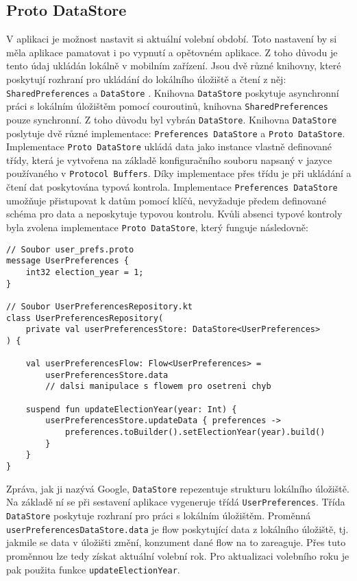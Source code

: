 \subsection*  {Proto DataStore}
V aplikaci je možnost nastavit si aktuální volební období. Toto nastavení by si měla aplikace pamatovat i po vypnutí a opětovném aplikace. Z toho důvodu je tento údaj ukládán lokálně v mobilním zařízení. Jsou dvě různé knihovny, které poskytují rozhraní pro ukládání do lokálního úložiště a čtení z něj: \lstinline|SharedPreferences| \cite{shared-preferences} a \lstinline|DataStore| \cite{data-store}. Knihovna \lstinline|DataStore| poskytuje asynchronní práci s lokálním úložištěm pomocí couroutinů, knihovna \lstinline|SharedPreferences| pouze synchronní. Z toho důvodu byl vybrán \lstinline|DataStore|. Knihovna \lstinline|DataStore| poslytuje dvě různé implementace: \lstinline|Preferences DataStore| a \lstinline|Proto DataStore|. Implementace \lstinline|Proto DataStore| ukládá data jako instance vlastně definované třídy, která je vytvořena na základě konfiguračního souboru napsaný v jazyce používaného v \lstinline|Protocol Buffers|. Díky implementace přes třídu je při ukládání a čtení dat poskytována typová kontrola. Implementace \lstinline|Preferences DataStore| umožňuje přistupovat k datům pomocí klíčů, nevyžaduje předem definované schéma pro data a neposkytuje typovou kontrolu. Kvůli absenci typové kontroly byla zvolena implementace \lstinline|Proto DataStore|, který funguje následovně:

\begin{lstlisting}[caption={Ukázka práce s Proto DataStore}, label={lst:proto-datastore}, tabsize=2]
// Soubor user_prefs.proto
message UserPreferences {
	int32 election_year = 1;
}

// Soubor UserPreferencesRepository.kt
class UserPreferencesRepository(
	private val userPreferencesStore: DataStore<UserPreferences>
) {
	
	val userPreferencesFlow: Flow<UserPreferences> = 
		userPreferencesStore.data
		// dalsi manipulace s flowem pro osetreni chyb
	
	suspend fun updateElectionYear(year: Int) {
		userPreferencesStore.updateData { preferences ->
			preferences.toBuilder().setElectionYear(year).build()
		}
	}
}
\end{lstlisting}

\noindent Zpráva, jak ji nazývá Google, \lstinline|DataStore| repezentuje strukturu lokálního úložiště. Na základě ní se při sestavení aplikace vygeneruje třídá \lstinline|UserPreferences|. Třída \lstinline|DataStore| poskytuje rozhraní pro práci s lokálním úložištěm. Proměnná \lstinline|userPreferencesDataStore.data| je flow poskytující data z lokálního úložiště, tj. jakmile se data v úložišti změní, konzument dané flow na to zareaguje. Přes tuto proměnnou lze tedy získat aktuální volební rok. Pro aktualizaci volebního roku je pak použita funkce \lstinline|updateElectionYear|.


